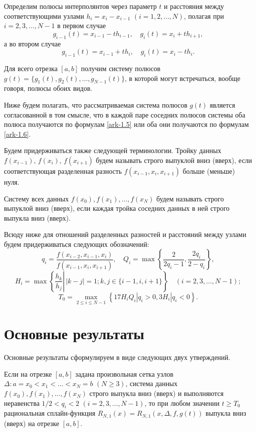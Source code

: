 Определим полюсы интерполянтов через параметр $t$ и расстояния между соответствующими узлами
$h_i=x_i-x_{i-1}$ $(i=1, 2,\dots,N)$, полагая при $i=2,3,\dots,N-1$ в первом случае
\begin{equation}\label{ark-1.5}
g_{i-1}(t)=x_{i-1}-th_{i-1},\quad g_i(t)=x_i+th_{i+1},
\end{equation}
 а во втором случае
\begin{equation}\label{ark-1.6}
g_{i-1}(t)=x_{i-1}+th_i,\quad g_i(t)=x_i-th_i.
\end{equation}

Для всего отрезка $[a,b]$ получим систему полюсов
$g(t)=\{g_1(t), g_2(t),\dots,g_{N-1}(t)\}$, в которой могут встречаться, вообще говоря, полюсы
обоих видов.

Ниже будем полагать, что рассматриваемая система полюсов $g(t)$ является согласованной в том
смысле, что в каждой паре соседних полюсов системы оба полюса получаются по формулам
\eqref{ark-1.5} или оба они получаются по формулам \eqref{ark-1.6}.

Будем придерживаться также следующей терминологии. Тройку данных $f(x_{i-1})$, $f(x_i)$, $f(x_{i+1})$
будем называть строго выпуклой вниз (вверх), если соответствующая разделенная разность
$f(x_{i-1}, x_i,x_{i+1})$ больше (меньше) нуля.

Систему всех данных $f(x_0), f(x_1),\dots,f(x_N)$ будем называть строго выпуклой вниз (вверх),
если каждая тройка соседних данных в ней строго выпукла вниз (вверх).

Всюду ниже для отношений разделенных разностей и расстояний между узлами
 будем придерживаться следующих обозначений:
$$
q_i=\frac{f(x_{i-2}, x_{i-1}, x_i)}{f(x_{i-1}, x_i, x_{i+1})}, \quad
Q_i=\max\left\{\frac 2{2q_i-1}, \frac{2q_i}{2-q_i}\right\},
$$
$$
H_i=\max\left\{\left.\frac{h_k}{h_j}\right\vert\,|k-j|=1; k,j\in\{i-1,i,i+1\}\right\}
\quad (i=2,3,\dots,N-1);
$$
$$
T_0=\max_{2\leqslant i\leqslant N-1}\left\{17 H_iQ_i |q_i>0, 3H_i|q_i<0 \right\}.
$$

\section{Основные результаты}

Основные результаты сформулируем в виде следующих двух утверждений.

\begin{theorem}\label{ark-teor1}
Если на отрезке $[a,b]$ задана произвольная сетка узлов $\Delta: a=x_0<x_1<\dots<x_N=b$
$(N\geqslant 3)$, система данных $f(x_0), f(x_1),\dots,f(x_N)$  строго выпукла вниз
{(}вверх{)} и выполняются неравенства $1/2<q_i<2$ $(i=2,3,\dots,N-1)$, то при любом
значении $t\geqslant T_0$ рациональная сплайн-функция $R_{N,1} (x)=R_{N,1}(x, \Delta, f, g(t))$
выпукла вниз {(}вверх{)} на отрезке $[a,b]$.
 \end{theorem}

